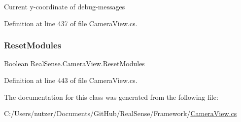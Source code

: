 Current y-\/coordinate of debug-\/messages 

Definition at line 437 of file Camera\+View.\+cs.

\mbox{\label{class_real_sense_1_1_camera_view_a342611e6157bb18b9c097186b3b9bee0}} 
\subsubsection{\texorpdfstring{Reset\+Modules}{ResetModules}}
{\footnotesize\ttfamily Boolean Real\+Sense.\+Camera\+View.\+Reset\+Modules\hspace{0.3cm}{\ttfamily [set]}}



Definition at line 443 of file Camera\+View.\+cs.



The documentation for this class was generated from the following file\+:\begin{DoxyCompactItemize}
\item 
C\+:/\+Users/nutzer/\+Documents/\+Git\+Hub/\+Real\+Sense/\+Framework/\hyperlink{_camera_view_8cs}{Camera\+View.\+cs}\end{DoxyCompactItemize}
